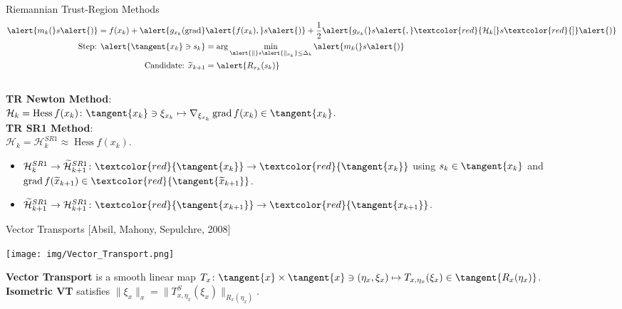 \documentclass{beamer}
\begin{document}
\begin{frame}{Riemannian Trust-Region Methods}
    \begin{align*}
        \alert{m_k(} s \alert{)} = f(x_k) + \alert{g_{x_k}(\operatorname{grad}} & \alert{f(x_k),} s \alert{)} + \frac{1}{2} \alert{g_{x_k}(} s \alert{,} \textcolor{red}{\mathcal{H}_k [} s \textcolor{red}{]} \alert{)} \\
        \text{Step: } \alert{\tangent{x_k} \ni s_k} & = \arg \min_{\alert{\lVert} s \alert{\rVert_{x_k}} \leq \Delta_k} \alert{m_k(} s \alert{)} \\
        \text{Candidate: } \widetilde{x}_{k+1} & = \alert{R_{x_k}(s_k)}
    \end{align*} \\[0.3\baselineskip]
    \textbf{TR Newton Method}: \\
    $\mathcal{H}_k = \operatorname{Hess} f(x_k) \colon \tangent{x_k} \ni \xi_{x_k} \mapsto \nabla_{\xi_{x_k}} \operatorname{grad} f(x_k) \in \tangent{x_k}$. \\[0.3\baselineskip]
	\textbf{TR SR1 Method}: \\
    $\mathcal{H}_k = \mathcal{H}^{SR1}_k \approx \operatorname{Hess} f(x_k)$.
    \begin{itemize}
        \item $\mathcal{H}^{SR1}_k \rightarrow \widetilde{\mathcal{H}}^{SR1}_{k+1} \colon \textcolor{red}{\tangent{x_k}} \to \textcolor{red}{\tangent{x_k}}$ using $s_k \in \tangent{x_k}$ and $\operatorname{grad}f(\widetilde{x}_{k+1}) \in \textcolor{red}{\tangent{\widetilde{x}_{k+1}}}$.
        \item $\widetilde{\mathcal{H}}^{SR1}_{k+1} \rightarrow \mathcal{H}^{SR1}_{k+1} \colon \textcolor{red}{\tangent{x_{k+1}}} \to \textcolor{red}{\tangent{x_{k+1}}}$.
    \end{itemize}
\end{frame}

\begin{frame}{Vector Transports}
    \vspace{-1\baselineskip}\hfill{\tiny{[Absil, Mahony, Sepulchre, 2008]}}
    \begin{center}
        \texttt{[image: img/Vector\_Transport.png]}
    \end{center}
    \textbf{Vector Transport} is a smooth linear map $T_x \colon \tangent{x} \times \tangent{x} \ni (\eta_x, \xi_x) \mapsto T_{x, \eta_x}(\xi_x) \in \tangent{R_x(\eta_x)}$. \\[0.5\baselineskip]
    \textbf{Isometric VT} satisfies $\lVert \xi_x \rVert_x = \lVert T^{S}_{x, \eta_x}(\xi_x) \rVert_{R_x(\eta_x)}$.
\end{frame}
\end{document}
